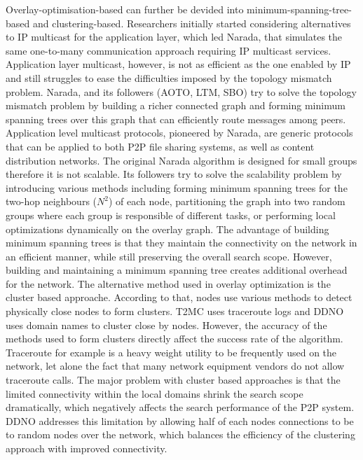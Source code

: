 Overlay-optimisation-based  can further be devided into
minimum-spanning-tree-based and clustering-based. Researchers initially started
considering alternatives to IP multicast for the application layer, which led
Narada, that simulates the same one-to-many communication approach requiring IP
multicast services. Application layer multicast, however, is not as efficient as
the one enabled by IP and still struggles to ease the difficulties imposed by
the topology mismatch problem. Narada, and its followers (AOTO, LTM, SBO) try to
solve the topology mismatch problem by building a richer connected graph and
forming minimum spanning trees over this graph that can efficiently route
messages among peers. Application level multicast protocols, pioneered by
Narada, are generic protocols that can be applied to both P2P file sharing
systems, as well as content distribution networks. The original Narada algorithm
is designed for small groups therefore it is not scalable. Its followers try to
solve the scalability problem by introducing various methods including forming
minimum spanning trees for the two-hop neighbours ($N^2$) of each node,
partitioning the graph into two random groups where each group is responsible of
different tasks, or performing local optimizations dynamically on the overlay
graph. The advantage of building minimum spanning trees is that they maintain
the connectivity on the network in an efficient manner, while still preserving
the overall search scope. However, building and maintaining a minimum spanning
tree creates additional overhead for the network. The alternative method used in
overlay optimization is the cluster based approache. According to that, nodes
use various methods to detect physically close nodes to form clusters. T2MC uses
traceroute logs and DDNO uses domain names to cluster close by nodes. However,
the accuracy of the methods used to form clusters directly affect the success
rate of the algorithm. Traceroute for example is a heavy weight utility to be
frequently used on the network, let alone the fact that many network equipment
vendors do not allow traceroute calls. The major problem with cluster based
approaches is that the limited connectivity within the local domains shrink the
search scope dramatically, which negatively affects the search performance of
the P2P system. DDNO addresses this limitation by allowing half of each nodes
connections to be to random nodes over the network, which balances the
efficiency of the clustering approach with improved connectivity.

